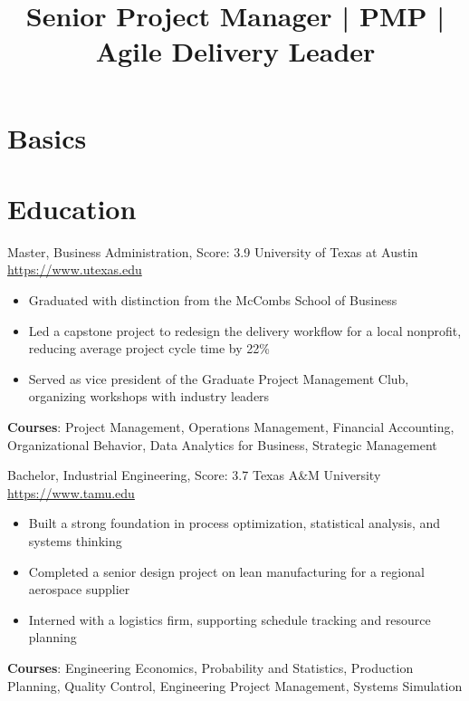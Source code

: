 \documentclass[a4paper, serif, 10pt]{moderncv}
\title{Senior Project Manager | PMP | Agile Delivery Leader}
\begin{document}
\maketitle

\section{Basics}

\section{Education}

        {Master, Business Administration, Score: 3.9}
        {University of Texas at Austin}
        {\url{https://www.utexas.edu}}
        {}
        {\begin{itemize}
\item Graduated with distinction from the McCombs School of Business
\item Led a capstone project to redesign the delivery workflow for a local nonprofit, reducing average project cycle time by 22\%
\item Served as vice president of the Graduate Project Management Club, organizing workshops with industry leaders
\end{itemize}
\textbf{Courses}: Project Management, Operations Management, Financial Accounting, Organizational Behavior, Data Analytics for Business, Strategic Management}

        {Bachelor, Industrial Engineering, Score: 3.7}
        {Texas A\&M University}
        {\url{https://www.tamu.edu}}
        {}
        {\begin{itemize}
\item Built a strong foundation in process optimization, statistical analysis, and systems thinking
\item Completed a senior design project on lean manufacturing for a regional aerospace supplier
\item Interned with a logistics firm, supporting schedule tracking and resource planning
\end{itemize}
\textbf{Courses}: Engineering Economics, Probability and Statistics, Production Planning, Quality Control, Engineering Project Management, Systems Simulation}
\end{document}
